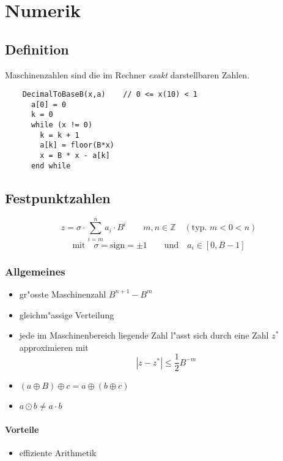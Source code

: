 \section{Numerik}

\subsection{Definition}
Maschinenzahlen sind die im Rechner {\em exakt} darstellbaren Zahlen.

\begin{verbatim}
    DecimalToBaseB(x,a)    // 0 <= x(10) < 1
      a[0] = 0
      k = 0
      while (x != 0)
        k = k + 1
        a[k] = floor(B*x)
        x = B * x - a[k]
      end while
\end{verbatim}

\subsection{Festpunktzahlen}
\begin{equation}
	z=\sigma\cdot\sum\limits_{i=m}^n a_i\cdot B^i \qquad m,n\in\mathbb{Z}\quad(\text{typ. } m<0<n)
\end{equation}
\begin{equation*}
	\text{mit}\quad\sigma=\text{sign}=\pm 1\qquad\text{und}\quad a_i\in [0,B-1]
\end{equation*}

\subsubsection{Allgemeines}
\begin{itemize}
	\item gr"osste Maschinenzahl $B^{n+1}-B^m$
	\item gleichm"assige Verteilung
	\item jede im Maschinenbereich liegende Zahl l"asst sich durch eine Zahl $z^{\ast}$ approximieren mit $$|z-z^\ast|\leq\frac{1}{2}B^{-m}$$
	\item $(a\oplus B)\oplus c = a\oplus (b\oplus c)$
	\item $a\odot b \neq a\cdot b$
\end{itemize}

\paragraph{Vorteile}
\begin{itemize}
	\item effiziente Arithmetik
\end{itemize}

